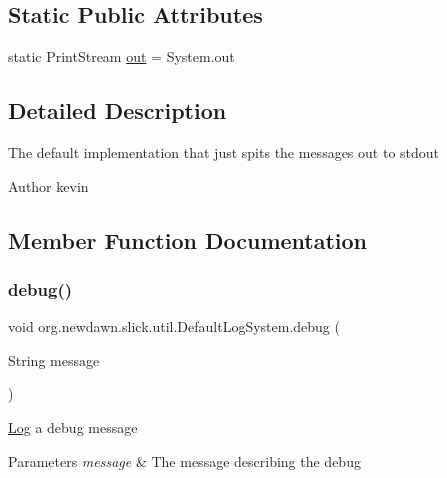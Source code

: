 \subsection*{Static Public Attributes}
\begin{DoxyCompactItemize}
\item 
static Print\+Stream \mbox{\hyperlink{classorg_1_1newdawn_1_1slick_1_1util_1_1_default_log_system_af8720c665caabb6455863d23de8617da}{out}} = System.\+out
\end{DoxyCompactItemize}


\subsection{Detailed Description}
The default implementation that just spits the messages out to stdout

\begin{DoxyAuthor}{Author}
kevin 
\end{DoxyAuthor}


\subsection{Member Function Documentation}
\mbox{\label{classorg_1_1newdawn_1_1slick_1_1util_1_1_default_log_system_ac1498dd15e05ecbca4f376da7bbdaa25}} 
\subsubsection{\texorpdfstring{debug()}{debug()}}
{\footnotesize\ttfamily void org.\+newdawn.\+slick.\+util.\+Default\+Log\+System.\+debug (\begin{DoxyParamCaption}\item[{String}]{message }\end{DoxyParamCaption})\hspace{0.3cm}{\ttfamily [inline]}}

\mbox{\hyperlink{classorg_1_1newdawn_1_1slick_1_1util_1_1_log}{Log}} a debug message


\begin{DoxyParams}{Parameters}
{\em message} & The message describing the debug \\
\hline
\end{DoxyParams}



